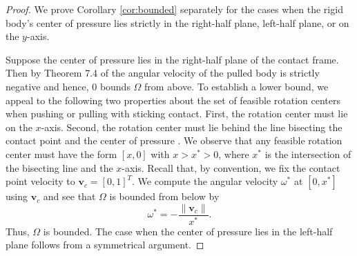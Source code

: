 \documentclass[conference]{IEEEtran}
\begin{document}
\begin{proof}
  We prove Corollary \ref{cor:bounded} separately for the cases when
  the rigid body's center of pressure lies strictly in the right-half
  plane, left-half plane, or on the $y$-axis.

  Suppose the center of pressure lies in the right-half plane of the
  contact frame. Then by Theorem 7.4 of \cite{Mason} the angular
  velocity of the pulled body is strictly negative and hence, $0$
  bounds $\Omega$ from above. To establish a lower bound, we appeal to
  the following two properties about the set of feasible rotation
  centers when pushing or pulling with sticking contact. First, the
  rotation center must lie on the $x$-axis. Second, the rotation
  center must lie behind the line bisecting the contact point and the
  center of pressure \cite{Mason}. We observe that any feasible
  rotation center must have the form $[x,0]$ with $x > x^* > 0$, where
  $x^*$ is the intersection of the bisecting line and the
  $x$-axis. Recall that, by convention, we fix the contact point
  velocity to $\mathbf{v}_c = [0,1]^T$. We compute the angular
  velocity $\omega^*$ at $[0,x^*]$ using $\mathbf{v}_c$ and see that
  $\Omega$ is bounded from below by
  \begin{equation}
    \omega^* = -\frac{\lVert\mathbf{v}_c\rVert}{x^*}.%
  \end{equation}
  Thus, $\Omega$ is bounded. The case when the center of pressure lies
  in the left-half plane follows from a symmetrical argument.  


\end{proof}
\end{document}
